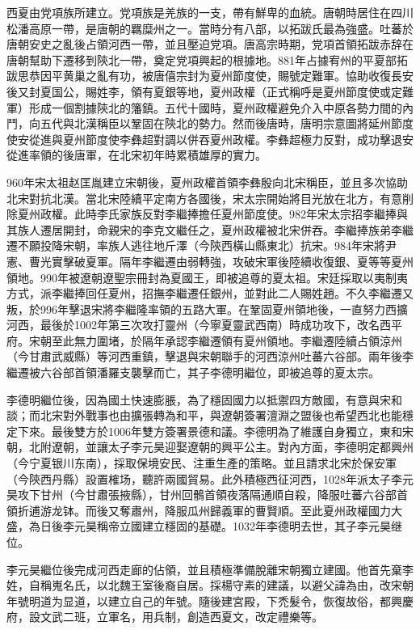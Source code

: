 西夏由党項族所建立。党項族是羌族的一支，帶有鮮卑的血統。唐朝時居住在四川松潘高原一帶，是唐朝的羈糜州之一。當時分有八部，以拓跋氏最為強盛。吐蕃於唐朝安史之亂後占領河西一帶，並且壓迫党項。唐高宗時期，党項首領拓跋赤辞在唐朝幫助下遷移到陝北一帶，奠定党項興起的根據地。881年占據宥州的平夏部拓跋思恭因平黄巢之亂有功，被唐僖宗封为夏州節度使，賜號定難軍。協助收復長安後又封夏国公，賜姓李，領有夏銀等地，夏州政權（正式稱呼是夏州節度使或定難軍）形成一個割據陝北的籓鎮。五代十國時，夏州政權避免介入中原各勢力間的內鬥，向五代與北漢稱臣以鞏固在陝北的勢力。然而後唐時，唐明宗意圖將延州節度使安從進與夏州節度使李彝超對調以併吞夏州政權。李彝超極力反對，成功擊退安從進率領的後唐軍，在北宋初年時累積雄厚的實力。

960年宋太祖赵匡胤建立宋朝後，夏州政權首領李彝殷向北宋稱臣，並且多次協助北宋對抗北漢。當北宋陸續平定南方各國後，宋太宗開始將目光放在北方，有意削除夏州政權。此時李氏家族反對李繼捧擔任夏州節度使。982年宋太宗招李繼捧與其族人遷居開封，命親宋的李克文繼任之，夏州政權被北宋併吞。李繼捧族弟李繼遷不願投降宋朝，率族人逃往地斤澤（今陝西橫山縣東北）抗宋。984年宋將尹憲、曹光實擊破夏軍。隔年李繼遷由弱轉強，攻破宋軍後陸續收復銀、夏等等夏州領地。990年被遼朝遼聖宗冊封為夏國王，即被追尊的夏太祖。宋廷採取以夷制夷方式，派李繼捧回任夏州，招撫李繼遷任銀州，並對此二人賜姓趙。不久李繼遷又叛，於996年擊退宋將李繼隆率領的五路大軍。在鞏固夏州領地後，一直努力西擴河西，最後於1002年第三次攻打靈州（今寧夏靈武西南）時成功攻下，改名西平府。宋朝至此無力圍堵，於隔年承認李繼遷領有夏州領地。李繼遷陸續占領涼州（今甘肅武威縣）等河西重鎮，擊退與宋朝聯手的河西涼州吐蕃六谷部。兩年後李繼遷被六谷部首領潘羅支襲擊而亡，其子李德明繼位，即被追尊的夏太宗。

李德明繼位後，因為國土快速膨脹，為了穩固國力以抵禦四方敵國，有意與宋和談；而北宋對外戰事也由擴張轉為和平，與遼朝簽署澶淵之盟後也希望西北也能穩定下來。最後雙方於1006年雙方簽署景德和議。李德明為了維護自身獨立，東和宋朝，北附遼朝，並讓太子李元昊迎娶遼朝的興平公主。對內方面，李德明定都興州（今宁夏银川东南），採取保境安民、注重生產的策略。並且請求北宋於保安軍（今陝西丹縣）設置榷场，聽許兩國貿易。此外積極西征河西，1028年派太子李元昊攻下甘州（今甘肅張掖縣），甘州回鶻首領夜落隔通順自殺，降服吐蕃六谷部首領折逋游龙钵。而後又奪肅州，降服瓜州歸義軍的曹賢順。至此夏州政權國力大盛，為日後李元昊稱帝立國建立穩固的基礎。1032年李德明去世，其子李元昊继位。

李元昊繼位後完成河西走廊的佔領，並且積極準備脫離宋朝獨立建國。他首先棄李姓，自稱嵬名氏，以北魏王室後裔自居。採楊守素的建議，以避父諱為由，改宋朝年號明道为显道，以建立自己的年號。隨後建宮殿，下禿髮令，恢復故俗，都興慶府，設文武二班，立軍名，用兵制，創造西夏文，改定禮樂等。


